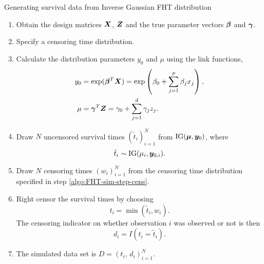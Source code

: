 \begin{algorithm}
\caption{Generating survival data from Inverse Gaussian FHT distribution}
\label{algo:FHT-sim}
\begin{enumerate}
    \item Obtain the design matrices $\bm{X}$, $\bm{Z}$ and the true parameter vectors $\boldsymbol{\beta}$ and $\boldsymbol{\gamma}$.
    \item\label{algo:FHT-sim-step-cens} Specify a censoring time distribution.
    \item Calculate the distribution parameters $y_0$ and $\mu$ using the link functions,
        \begin{align*}
            y_0&=\exp(\boldsymbol{\beta}^T\bm{X})=\exp\left(\beta_0+\sum_{j=1}^p\beta_jx_j\right), \\
            \mu&=\boldsymbol{\gamma}^T\bm{Z}=\gamma_0+\sum_{j=1}^d\gamma_jz_j.
        \end{align*}
    \item Draw $N$ uncensored survival times $(\tilde{t}_i)_{i=1}^N$ from $\operatorname{IG}(\boldsymbol{\mu},\boldsymbol{y}_0)$, where
        \begin{equation*}
            \tilde{t}_i\sim\operatorname{IG}(\mu_i,\bm{y}_{0,i}).
        \end{equation*}
    \item Draw $N$ censoring times $(w_i)_{i=1}^N$ from the censoring time distribution specified in step \ref{algo:FHT-sim-step-cens}.
    \item Right censor the survival times by choosing
            \begin{equation*}
                t_i=\min(\tilde{t}_i,w_i).
            \end{equation*}
          The censoring indicator on whether observation $i$ was observed or not is then
          \begin{equation*}
            d_i=I(t_i=\tilde{t}_i).
          \end{equation*}
    \item The simulated data set is $D=(t_i,\,d_i)_{i=1}^N$.
\end{enumerate}
\end{algorithm}

